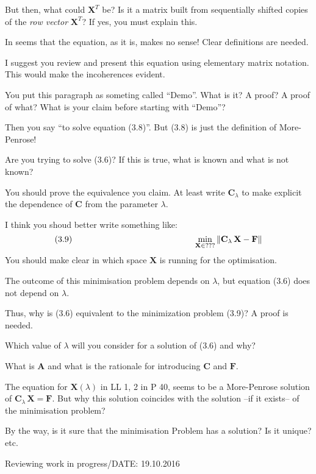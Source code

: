 \begin{description}[style=unboxed,leftmargin=0cm,itemsep=3ex]
But then, what could $\mathbf{X}^T$ be?
Is it a matrix built from sequentially shifted copies of the 
{\em row vector\/} $\mathbf{X}^T$?
If yes, you must explain this.

In seems that the equation, as it is, makes no sense!
Clear definitions are needed.

I suggest you review and present this equation using elementary matrix
notation. This would make the incoherences evident.


You put this paragraph as someting called ``Demo''.
What is it? A proof? A proof of what? 
What is your claim before starting with ``Demo''?

Then you say ``to solve equation (3.8)''.
But (3.8) is just the definition of More-Penrose!

Are you trying to solve (3.6)?
If this is true, what is known and what is not known?

You should prove the equivalence you claim.
At least write $\mathbf{C}_\lambda$ to make explicit the dependence of
$\mathbf{C}$ from the parameter $\lambda$.

I think you shoud better write something like:
$$
(3.9)\rule{50mm}{0pt} \min_{\mathbf X \in \text{???}}
\|\mathbf{C}_\lambda\,\mathbf{X}-\mathbf{F}\|
$$
You should make clear in which space $\mathbf{X}$ is running for the
optimisation.

The outcome of this minimisation problem depends on $\lambda$, but
equation (3.6) does not depend on $\lambda$.

Thus, why is (3.6) equivalent to the minimization problem (3.9)?
A proof is needed.

Which value of $\lambda$ will you consider for a solution of (3.6) and why?

What is $\mathbf{A}$ and what is the rationale for introducing $\mathbf{C}$
and $\mathbf{F}$.

The equation for $\mathbf{X}(\lambda)$ in LL 1, 2 in P 40, seems to be a
More-Penrose solution of $\mathbf{C}_\lambda\,\mathbf{X}=\mathbf{F}$.
But why this solution coincides with the solution --if it exists-- of the
minimisation problem?

By the way, is it sure that the minimisation Problem has a solution?
Is it unique? etc.

\end{description}

Reviewing work in progress/DATE: 19.10.2016

